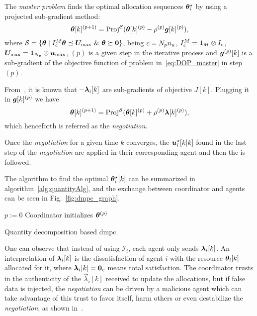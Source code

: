 \documentclass{ifacconf}  %
\begin{document}
The \emph{master problem} finds the optimal allocation sequences $\boldsymbol{\theta}_i^{\star}$ by using a projected sub-gradient method:
\begin{equation}
  \label{eq:projectedSubgradient}
\boldsymbol{\theta}[k]^{(p+1)}=\operatorname{Proj}^{\mathcal{S}}(\boldsymbol{\theta}[k]^{(p)}-\rho^{(p)}\boldsymbol{g}[k]^{(p)}),
\end{equation}
where ${\set{S} = \setbuild{\vec{\theta}}{I_{c}^{M}\vec{\theta}\preceq \vec{U}_{\max}\ \&\ \vec{\theta}\succeq\0 }}$, being ${c=N_{p} n_{u}}$, ${I_{c}^{M}=\mathbf{1}_{M}\mathbin{\otimes}I_{c}}$, ${\boldsymbol{U}_{\max}=\mathbf{1}_{N_{p}}\mathbin{\otimes}\boldsymbol{u}_{\max}}$, $(p)$ is a given step in the iterative process and $\boldsymbol{g}^{(p)}[k]$ is a sub-gradient of the objective function of problem in~\eqref{eq:DOP_master} in step $(p)$.

From~\cite{BoydEtAl2015}, it is known that $-\lambdaik$ are sub-gradients of objective $J[k]$.
Plugging it in $\boldsymbol{g}[k]^{(p)}$ we have
\begin{equation}
  \label{eq:thetaNegot}
\boldsymbol{\theta}[k]^{(p+1)}=\operatorname{Proj}^{\mathcal{S}}(\boldsymbol{\theta}[k]^{(p)}+\rho^{(p)}\boldsymbol{\lambda}[k]^{(p)}),
\end{equation}
\newcommand{\negotiation}{\emph{negotiation}}
which henceforth is referred as the \negotiation.

Once the \negotiation{} for a given time $k$ converges, the $\optuikk$ found in the last step of the \negotiation{} are applied in their corresponding agent and then the \rhs{} is followed.

The algorithm to find the optimal $\boldsymbol{\theta}_i^{\star}[k]$ can be summarized in algorithm~\ref{alg:quantityAlg}, and the exchange between coordinator and agents can be seen in Fig.~\ref{fig:dmpc_graph}.

\begin{algorithm2e}[h]
  \DontPrintSemicolon%
  $p:=0$\;
  Coordinator initializes $\boldsymbol{\theta}^{(p)}$ \;
 \caption{Quantity decomposition based \acrshort{dmpc}.}\label{alg:quantityAlg}
\end{algorithm2e}

One can observe that instead of using $\mathcal{I}_{i}$, each agent only sends $\lambdaik$.
An interpretation of $\lambdaik$ is the dissatisfaction of agent $i$ with the resource $\thetaik$ allocated for it, where ${\lambdaik=\0_{c}}$ means total satisfaction.
The coordinator trusts in the authenticity of the $\vec{\lambda}_{i}[k]$ received to update the allocations, but if false data is injected, the \negotiation{} can be driven by a malicious agent which can take advantage of this trust to favor itself, harm others or even destabilize the \negotiation{}, as shown in~\cite{NogueiraEtAl2021}.
\end{document}
